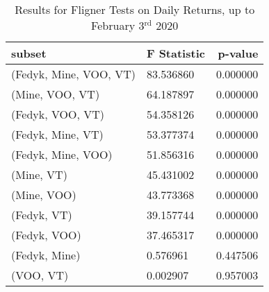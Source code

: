 \begin{appendices}
\begin{table}[ht]
\centering
\caption{Results for Fligner Tests on Daily Returns, up to February 3$^\text{rd}$ 2020}
    \begin{tabular}{l|ll}
    \toprule
    \textbf{subset}        & \multicolumn{1}{r}{\textbf{F Statistic}} & \multicolumn{1}{r}{\textbf{p-value}} \\ \midrule
    \midrule
    (Fedyk, Mine, VOO, VT)              & 83.536860                      & 0.000000                       \\
    (Mine, VOO, VT)                     & 64.187897                      & 0.000000                       \\
    (Fedyk, VOO, VT)                    & 54.358126                      & 0.000000                       \\
    (Fedyk, Mine, VT)                   & 53.377374                      & 0.000000                       \\
    (Fedyk, Mine, VOO)                  & 51.856316                      & 0.000000                       \\
    (Mine, VT)                          & 45.431002                      & 0.000000                       \\
    (Mine, VOO)                         & 43.773368                      & 0.000000                       \\
    (Fedyk, VT)                         & 39.157744                      & 0.000000                       \\
    (Fedyk, VOO)                        & 37.465317                      & 0.000000                       \\
    (Fedyk, Mine)                       & 0.576961                       & 0.447506                       \\
    (VOO, VT)                           & 0.002907                       & 0.957003                      
    \end{tabular}
\label{tab:fligner_before}
\end{table}


\end{appendices}
